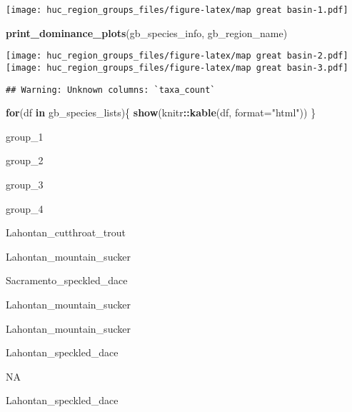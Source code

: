 \documentclass[]{article}
\newenvironment{Shaded}{\begin{snugshade}}{\end{snugshade}}
\newcommand{\KeywordTok}[1]{\textcolor[rgb]{0.13,0.29,0.53}{\textbf{#1}}}
\newcommand{\DataTypeTok}[1]{\textcolor[rgb]{0.13,0.29,0.53}{#1}}
\newcommand{\StringTok}[1]{\textcolor[rgb]{0.31,0.60,0.02}{#1}}
\newcommand{\CommentTok}[1]{\textcolor[rgb]{0.56,0.35,0.01}{\textit{#1}}}
\newcommand{\ControlFlowTok}[1]{\textcolor[rgb]{0.13,0.29,0.53}{\textbf{#1}}}
\newcommand{\OperatorTok}[1]{\textcolor[rgb]{0.81,0.36,0.00}{\textbf{#1}}}
\newcommand{\NormalTok}[1]{#1}
\begin{document}
\texttt{[image: huc\_region\_groups\_files/figure-latex/map great basin-1.pdf]}

\begin{Shaded}
\begin{Highlighting}[]
\KeywordTok{print_dominance_plots}\NormalTok{(gb_species_info, gb_region_name)}
\end{Highlighting}
\end{Shaded}

\texttt{[image: huc\_region\_groups\_files/figure-latex/map great basin-2.pdf]}
\texttt{[image: huc\_region\_groups\_files/figure-latex/map great basin-3.pdf]}

\begin{Shaded}
\end{Shaded}

\begin{verbatim}
## Warning: Unknown columns: `taxa_count`
\end{verbatim}

\begin{Shaded}
\begin{Highlighting}[]
\ControlFlowTok{for}\NormalTok{(df }\ControlFlowTok{in}\NormalTok{ gb_species_lists)\{}
  \KeywordTok{show}\NormalTok{(knitr}\OperatorTok{::}\KeywordTok{kable}\NormalTok{(df, }\DataTypeTok{format=}\StringTok{"html"}\NormalTok{))}
\NormalTok{\}}
\end{Highlighting}
\end{Shaded}

group\_1

group\_2

group\_3

group\_4

Lahontan\_cutthroat\_trout

Lahontan\_mountain\_sucker

Sacramento\_speckled\_dace

Lahontan\_mountain\_sucker

Lahontan\_mountain\_sucker

Lahontan\_speckled\_dace

NA

Lahontan\_speckled\_dace
\end{document}

